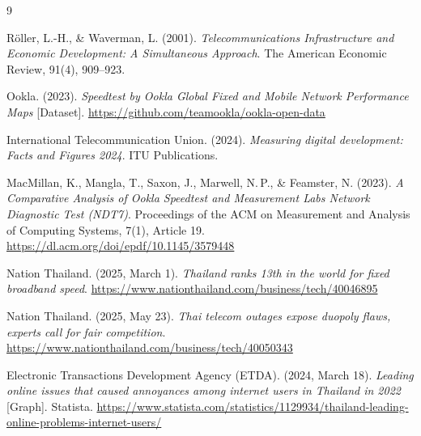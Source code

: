 \documentclass[sigconf]{acmart}
\begin{document}
\begin{thebibliography}{9}

Röller, L.-H., \& Waverman, L. (2001).
\textit{Telecommunications Infrastructure and Economic Development:
A Simultaneous Approach}.
The American Economic Review, 91(4), 909--923.

Ookla. (2023).
\textit{Speedtest by Ookla Global Fixed and Mobile Network Performance Maps}
[Dataset].
\url{https://github.com/teamookla/ookla-open-data}

International Telecommunication Union. (2024).
\textit{Measuring digital development: Facts and Figures 2024}.
ITU Publications.

MacMillan, K., Mangla, T., Saxon, J., Marwell, N.\,P., \& Feamster, N. (2023).
\textit{A Comparative Analysis of Ookla Speedtest and Measurement Labs
Network Diagnostic Test (NDT7)}.
Proceedings of the ACM on Measurement and Analysis of Computing Systems,
7(1), Article 19. \url{https://dl.acm.org/doi/epdf/10.1145/3579448}

Nation Thailand. (2025, March 1).
\textit{Thailand ranks 13th in the world for fixed broadband speed}.
\url{https://www.nationthailand.com/business/tech/40046895}

Nation Thailand. (2025, May 23).
\textit{Thai telecom outages expose duopoly flaws, experts call for fair
competition}.
\url{https://www.nationthailand.com/business/tech/40050343}

Electronic Transactions Development Agency (ETDA). (2024, March 18).
\textit{Leading online issues that caused annoyances among internet users
in Thailand in 2022} [Graph]. Statista.
\url{https://www.statista.com/statistics/1129934/thailand-leading-online-problems-internet-users/}

\end{thebibliography}
\end{document}

